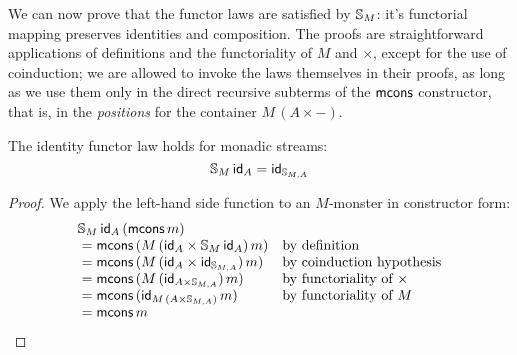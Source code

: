 We can now prove that the functor laws are satisfied by $\mathbb{S}_{M}$: it's functorial mapping preserves identities and composition.
The proofs are straightforward applications of definitions and the functoriality of $M$ and $\times$, except for the use of coinduction;
we are allowed to invoke the laws themselves in their proofs, as long as we use them only in the direct recursive subterms of the $\mathsf{mcons}$ constructor, that is, in the {\em positions} for the container $M\,(A\times -)$.

\begin{lemma}\label{lemma:functor_id}
The identity functor law holds for monadic streams:
$$
\mathbb{S}_{M}\,\mathsf{id}_A = \mathsf{id}_{\mathbb{S}_{M,A}}
$$
\end{lemma}
\begin{proof}
We apply the left-hand side function to an $M$-monster in constructor form:
$$
\begin{array}{ll}
\mathbb{S}_{M}\,\mathsf{id}_A\,(\mathsf{mcons}\,m)\\
{}= \mathsf{mcons}\,(M\,(\mathsf{id}_A\times \mathbb{S}_{M}\,\mathsf{id}_A)\,m)
  & \mbox{by definition}\\
{}= \mathsf{mcons}\,(M\,(\mathsf{id}_A\times \mathsf{id}_{\mathbb{S}_{M,A}})\,m)
  & \mbox{by coinduction hypothesis}\\
{}= \mathsf{mcons}\,(M\,(\mathsf{id}_{A\times \mathbb{S}_{M,A}})\,m)
  & \mbox{by functoriality of }\times\\
{}= \mathsf{mcons}\,(\mathsf{id}_{M\,(A\times \mathbb{S}_{M,A})}\,m)
  & \mbox{by functoriality of }M\\
{}= \mathsf{mcons}\,m
\end{array}
$$
\end{proof}

